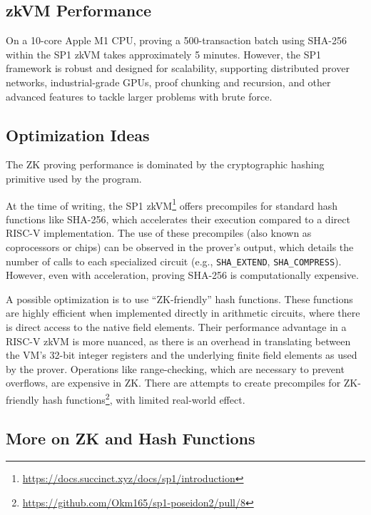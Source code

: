 \documentclass[twocolumn]{article}
\begin{document}
\subsection{zkVM Performance}

On a 10-core Apple M1 CPU, proving a 500-transaction batch using SHA-256 within the SP1 zkVM takes approximately 5 minutes. However, the SP1 framework is robust and designed for scalability, supporting distributed prover networks, industrial-grade GPUs, proof chunking and recursion, and other advanced features to tackle larger problems with brute force.


\subsection{Optimization Ideas}

The ZK proving performance is dominated by the cryptographic hashing primitive used by the program.

At the time of writing, the SP1 zkVM\footnote{\url{https://docs.succinct.xyz/docs/sp1/introduction}} offers precompiles for standard hash functions like SHA-256, which accelerates their execution compared to a direct RISC-V implementation. The use of these precompiles (also known as coprocessors or chips) can be observed in the prover's output, which details the number of calls to each specialized circuit (e.g., \lstinline|SHA_EXTEND|, \lstinline|SHA_COMPRESS|). However, even with acceleration, proving SHA-256 is computationally expensive.

A possible optimization is to use ``ZK-friendly'' hash functions. These functions are highly efficient when implemented directly in arithmetic circuits, where there is direct access to the native field elements. Their performance advantage in a RISC-V zkVM is more nuanced, as there is an overhead in translating between the VM's 32-bit integer registers and the underlying finite field elements as used by the prover. Operations like range-checking, which are necessary to prevent overflows, are expensive in ZK. There are attempts to create precompiles for ZK-friendly hash functions\footnote{\url{https://github.com/Okm165/sp1-poseidon2/pull/8}}, with limited real-world effect.


\subsection{More on ZK and Hash Functions}
\end{document}
